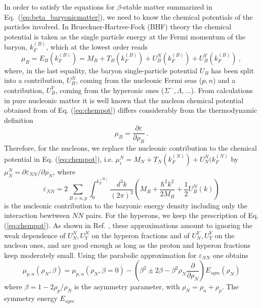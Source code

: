 In order to satisfy the equations 
for $\beta$-stable matter summarized in Eq.\ (\ref{eq:beta_baryonicmatter}), 
we need to know the chemical potentials of the particles involved.
In Brueckner-Hartree-Fock (BHF) theory the chemical potential is taken as
the
single particle energy at the Fermi momentum of the baryon, $k_F^{(B)}$,
which at the lowest order reads
\begin{equation}
\mu_B=E_B(k_F^{(B)})=M_B+T_B(k_F^{(B)})+U_B^N(k_F^{(B)})+
U_B^Y(k_F^{(B)}) \ ,
\label{eq:chempot}
\end{equation}
where, in the last equality, the baryon
single-particle potential $U_B$ has been split into a contribution,
$U_B^N$, coming from the nucleonic Fermi seas ($p, n$) and a contribution,
$U_B^Y$,
coming from the hyperonic ones ($\Sigma^-, \Lambda, \dots$).
From calculations in pure nucleonic matter it is well known
that the nucleon chemical potential obtained from of 
Eq. (\ref{eq:chempot}) differs considerably
from the thermodynamic definition
\begin{equation}
\mu_B= \frac{\partial \varepsilon}{\partial \rho_B}  \ .
\end{equation}
Therefore, for the nucleons, we replace the nucleonic contribution 
to the
chemical potential in Eq. (\ref{eq:chempot}), i.e. $\mu_i^N=
M_N+T_N(k_F^{(N)})+U_N^N(k_F^{(N)}$
by $\mu_N^N=\partial \varepsilon_{NN}/\partial \rho_N$, 
where 
\begin{equation}
\varepsilon_{NN}=
2\sum_{B=n,p}
\int_0^{k_F^{(B)}} \frac{d^3 k}{(2\pi)^3}
\left(M_B + \frac{\hbar^2k^2}{2M_B}+\frac{1}{2}U_B^N(k) \right) 
\label{eq:nnepsilon}
\end{equation}
is the nucleonic contribution to the baryonic
energy density including only the interaction bewtween $NN$ pairs.
For the hyperons, we keep the prescription of Eq. (\ref{eq:chempot}).
As shown in Ref. \cite{bbs00}, these approximations amount to ignoring
the weak dependence of $U_N^N, U_Y^N$ on the hyperon fractions and
of $U_N^Y, U_Y^Y$ on the nucleon ones, and are good enough as long
as the proton and hyperon fractions keep moderately small. 
Using the parabolic approximation for 
$\varepsilon_{NN}$
one obtains
\cite{bbs00}
\begin{equation}
\mu_{p,n}(\rho_N,\beta)=\mu_{p,n}(\rho_N,\beta=0)-\left(\beta^2 \pm 2\beta
-\beta^2\rho_N
\frac{\partial}{\partial \rho_N}\right)E_{sym}(\rho_N)
\end{equation}
where $\beta=1-2\rho_p/\rho_N$ is the asymmetry parameter, with
$\rho_N=\rho_n+\rho_p$. The symmetry energy
$E_{sym}$
